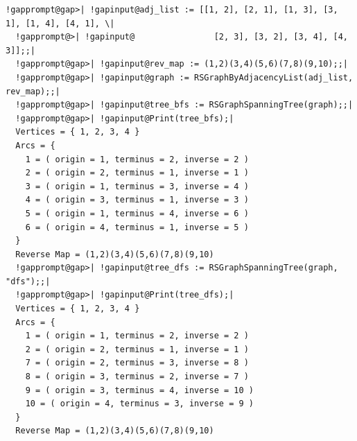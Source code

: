 \documentclass[a4paper,11pt]{report}
\begin{document}
{{ 
\begin{Verbatim}[commandchars=!@|,fontsize=\small,frame=single,label=Example]
  !gapprompt@gap>| !gapinput@adj_list := [[1, 2], [2, 1], [1, 3], [3, 1], [1, 4], [4, 1], \|
  !gapprompt@>| !gapinput@                [2, 3], [3, 2], [3, 4], [4, 3]];;|
  !gapprompt@gap>| !gapinput@rev_map := (1,2)(3,4)(5,6)(7,8)(9,10);;|
  !gapprompt@gap>| !gapinput@graph := RSGraphByAdjacencyList(adj_list, rev_map);;|
  !gapprompt@gap>| !gapinput@tree_bfs := RSGraphSpanningTree(graph);;|
  !gapprompt@gap>| !gapinput@Print(tree_bfs);|
  Vertices = { 1, 2, 3, 4 }
  Arcs = {
  	1 = ( origin = 1, terminus = 2, inverse = 2 )
  	2 = ( origin = 2, terminus = 1, inverse = 1 )
  	3 = ( origin = 1, terminus = 3, inverse = 4 )
  	4 = ( origin = 3, terminus = 1, inverse = 3 )
  	5 = ( origin = 1, terminus = 4, inverse = 6 )
  	6 = ( origin = 4, terminus = 1, inverse = 5 )
  }
  Reverse Map = (1,2)(3,4)(5,6)(7,8)(9,10)
  !gapprompt@gap>| !gapinput@tree_dfs := RSGraphSpanningTree(graph, "dfs");;|
  !gapprompt@gap>| !gapinput@Print(tree_dfs);|
  Vertices = { 1, 2, 3, 4 }
  Arcs = {
  	1 = ( origin = 1, terminus = 2, inverse = 2 )
  	2 = ( origin = 2, terminus = 1, inverse = 1 )
  	7 = ( origin = 2, terminus = 3, inverse = 8 )
  	8 = ( origin = 3, terminus = 2, inverse = 7 )
  	9 = ( origin = 3, terminus = 4, inverse = 10 )
  	10 = ( origin = 4, terminus = 3, inverse = 9 )
  }
  Reverse Map = (1,2)(3,4)(5,6)(7,8)(9,10)
\end{Verbatim}
 }

 }

   
\end{document}
